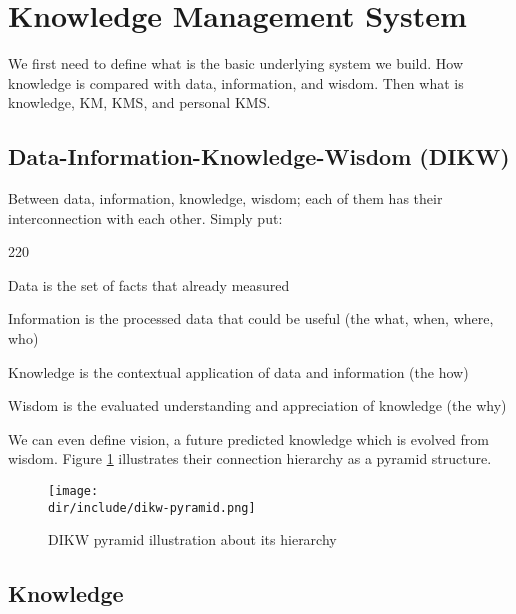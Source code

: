 \section{Knowledge Management System}
\label{sec:kms}

We first need to define what is the basic underlying system we build.
How knowledge is compared with data, information, and wisdom.
Then what is knowledge, \ac{KM}, \ac{KMS}, and personal \ac{KMS}.

\subsection{Data-Information-Knowledge-Wisdom (DIKW)}

Between data, information, knowledge, wisdom; each of them has their interconnection with each other. Simply put:

\begin{dinglist}{220}
\item Data is the set of facts that already measured
\item Information is the processed data that could be useful (the what, when, where, who)
\item Knowledge is the contextual application of data and information (the how)
\item Wisdom is the evaluated understanding and appreciation of knowledge (the why)
\end{dinglist}

We can even define vision, a future predicted knowledge which is evolved from wisdom.
Figure \ref{fig:kms:dikw-pyramid} illustrates their connection hierarchy as a pyramid structure.

\begin{figure}[htbp]
    \centering
    \texttt{[image: \\dir/include/dikw-pyramid.png]}
    \caption[DIKW Pyramid]{DIKW pyramid illustration about its hierarchy}
    \label{fig:kms:dikw-pyramid}
\end{figure}

\subsection{Knowledge}

